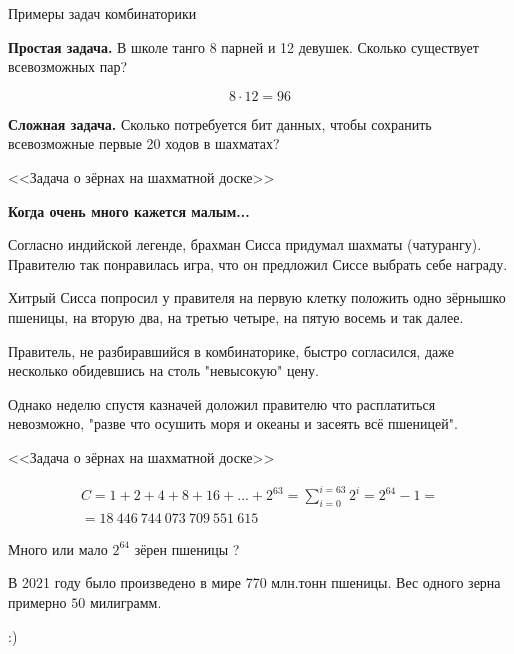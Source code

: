 \begin{frame}{Примеры задач комбинаторики}

\textbf{Простая задача.}
В школе танго 8 парней 
и 12 девушек.
Сколько существует всевозможных пар?

\begin{equation*}
8 \cdot 12 = 96
\end{equation*}

\textbf{Сложная задача.}
Сколько потребуется бит данных, 
чтобы сохранить всевозможные первые 20 ходов в шахматах?
\end{frame}


\begin{frame}{<<Задача о зёрнах на шахматной доске>>}
	
	\textbf{Когда очень много кажется малым...}
	
	Согласно индийской легенде, 
	брахман Сисса придумал шахматы (чатурангу).
	Правителю так понравилась игра, что он предложил Сиссе 
	выбрать себе награду.
	
	Хитрый Сисса попросил у правителя 
	на первую клетку положить одно зёрнышко пшеницы,
	на вторую два, 
	на третью четыре,
	на пятую восемь и так далее.
	
	Правитель, не разбиравшийся в комбинаторике,
	быстро согласился, даже несколько 
	обидевшись на столь "невысокую" цену.
	
	Однако неделю спустя 
	казначей доложил правителю что расплатиться невозможно,
	"разве что осушить моря и океаны и засеять всё пшеницей".
	
\end{frame}

\begin{frame}{<<Задача о зёрнах на шахматной доске>>}

\begin{equation*}
\begin{matrix}
C = 1 + 2 + 4 + 8 + 16 + ... + 2^{63} = \sum_{i=0}^{i=63} 2^i = 2^{64} - 1 = \\
= 18~446~744~073~709~551~615
\end{matrix}
\end{equation*}

Много или мало $2^{64}$ зёрен пшеницы ?

В 2021 году было произведено в мире 770 млн.тонн пшеницы.
Вес одного зерна примерно $50$ милиграмм.

 :)

\end{frame}

